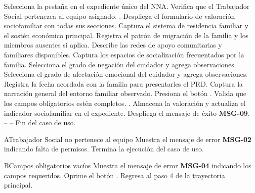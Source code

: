 \begin{UCtrayectoria}
	\UCpaso[\UCactor] Selecciona la pestaña  en el expediente único del NNA.
	\UCpaso Verifica que el Trabajador Social pertenezca al equipo asignado. .
	\UCpaso Despliega el formulario de valoración sociofamiliar con todas sus secciones.
	\UCpaso[\UCactor] Captura el sistema de residencia familiar y el sostén económico principal.
	\UCpaso[\UCactor] Registra el patrón de migración de la familia y los miembros ausentes si aplica.
	\UCpaso[\UCactor] Describe las redes de apoyo comunitarias y familiares disponibles.
	\UCpaso[\UCactor] Captura los espacios de socialización frecuentados por la familia.
	\UCpaso[\UCactor] Selecciona el grado de negación del cuidador y agrega observaciones.
	\UCpaso[\UCactor] Selecciona el grado de afectación emocional del cuidador y agrega observaciones.
	\UCpaso[\UCactor] Registra la fecha acordada con la familia para presentarles el PRD.
	\UCpaso[\UCactor] Captura la narración general del entorno familiar observado.
	\UCpaso[\UCactor] Presiona el botón .
	\UCpaso Valida que los campos obligatorios estén completos. .
	\UCpaso Almacena la valoración y actualiza el indicador sociofamiliar en el expediente.
	\UCpaso Despliega el mensaje de éxito \textbf{MSG-09}.
	\UCpaso[] -- -- Fin del caso de uso.
\end{UCtrayectoria}

\begin{UCtrayectoriaA}{A}{Trabajador Social no pertenece al equipo}
	\UCpaso Muestra el mensaje de error \textbf{MSG-02} indicando falta de permisos.
	\UCpaso Termina la ejecución del caso de uso.
\end{UCtrayectoriaA}

\begin{UCtrayectoriaA}{B}{Campos obligatorios vacíos}
	\UCpaso Muestra el mensaje de error \textbf{MSG-04} indicando los campos requeridos.
	\UCpaso[\UCactor] Oprime el botón .
	\UCpaso Regresa al paso 4 de la trayectoria principal.
\end{UCtrayectoriaA}


